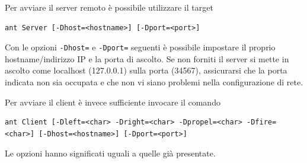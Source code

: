 \documentclass[a4paper,12pt]{article}
\begin{document}
Per avviare il server remoto \`e possibile utilizzare il target
\begin{lstlisting}[basicstyle=\ttfamily]
ant Server [-Dhost=<hostname>] [-Dport=<port>]
\end{lstlisting}

Con le opzioni \texttt{-Dhost=} e \texttt{-Dport=} seguenti \`e possibile impostare il proprio hostname/indirizzo IP e la porta di ascolto. Se non forniti il server si mette in ascolto come localhost (127.0.0.1) sulla porta (34567), assicurarsi che la porta indicata non sia occupata e che non vi siano problemi nella configurazione di rete.

Per avviare il client \`e invece sufficiente invocare il comando 
\begin{lstlisting}[basicstyle=\ttfamily]
ant Client [-Dleft=<char> -Dright=<char> -Dpropel=<char> -Dfire=<char>] [-Dhost=<hostname>] [-Dport=<port>]
\end{lstlisting}

Le opzioni hanno significati uguali a quelle gi\`a presentate.

\newpage
\listoffigures
\end{document}
